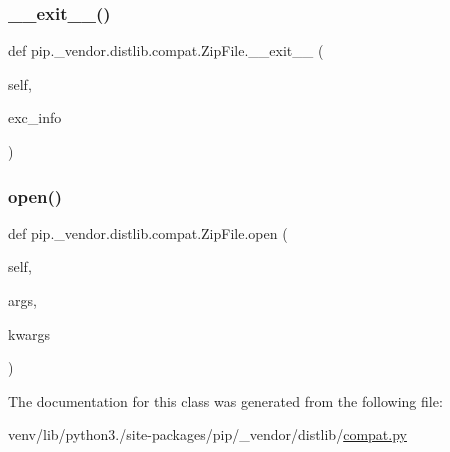 \subsubsection{\texorpdfstring{\+\_\+\+\_\+exit\+\_\+\+\_\+()}{\_\_exit\_\_()}}
{\footnotesize\ttfamily def pip.\+\_\+vendor.\+distlib.\+compat.\+Zip\+File.\+\_\+\+\_\+exit\+\_\+\+\_\+ (\begin{DoxyParamCaption}\item[{}]{self,  }\item[{}]{exc\+\_\+info }\end{DoxyParamCaption})}

\mbox{\label{classpip_1_1__vendor_1_1distlib_1_1compat_1_1ZipFile_afd7a60129e4227d3547726f3bb302c71}} 
\subsubsection{\texorpdfstring{open()}{open()}}
{\footnotesize\ttfamily def pip.\+\_\+vendor.\+distlib.\+compat.\+Zip\+File.\+open (\begin{DoxyParamCaption}\item[{}]{self,  }\item[{}]{args,  }\item[{}]{kwargs }\end{DoxyParamCaption})}



The documentation for this class was generated from the following file\+:\begin{DoxyCompactItemize}
\item 
venv/lib/python3./site-\/packages/pip/\+\_\+vendor/distlib/\hyperlink{__vendor_2distlib_2compat_8py}{compat.\+py}\end{DoxyCompactItemize}
